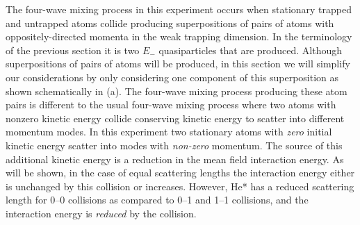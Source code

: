 The four-wave mixing process in this experiment occurs when stationary trapped and untrapped atoms collide producing superpositions of pairs of atoms with oppositely-directed momenta in the weak trapping dimension. In the terminology of the previous section it is two $E_-$ quasiparticles that are produced. Although superpositions of pairs of atoms will be produced, in this section we will simplify our considerations by only considering one component of this superposition as shown schematically in (a). The four-wave mixing process producing these atom pairs is different to the usual four-wave mixing process where two atoms with nonzero kinetic energy collide conserving kinetic energy to scatter into different momentum modes. In this experiment two stationary atoms with \emph{zero} initial kinetic energy scatter into modes with \emph{non-zero} momentum. The source of this additional kinetic energy is  a reduction in the mean field interaction energy. As will be shown, in the case of equal scattering lengths the interaction energy either is unchanged by this collision or increases. However, He* has a reduced scattering length for 0--0 collisions as compared to 0--1 and 1--1 collisions, and the interaction energy is \emph{reduced} by the collision.

